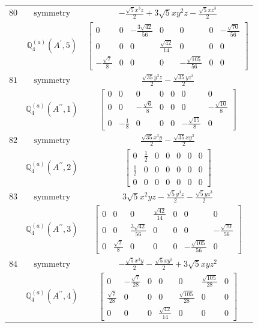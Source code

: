 \documentclass[fleqn,8pt,landscape]{jsarticle}
\begin{document}
\begin{longtable}{ccc}
$ 80 $ & $ \text{symmetry} $ & $ - \frac{\sqrt{5} x^{3} z}{2} + 3 \sqrt{5} x y^{2} z - \frac{\sqrt{5} x z^{3}}{2} $ \\
$  $ & $ \mathbb{Q}_{4}^{(a)}(A^{\prime},5) $ & $ \begin{bmatrix} 0 & 0 & - \frac{3 \sqrt{42}}{56} & 0 & 0 & 0 & - \frac{\sqrt{70}}{56} \\ 0 & 0 & 0 & \frac{\sqrt{42}}{14} & 0 & 0 & 0 \\ - \frac{\sqrt{7}}{8} & 0 & 0 & 0 & - \frac{\sqrt{105}}{56} & 0 & 0 \end{bmatrix} $ \\ \hline
$ 81 $ & $ \text{symmetry} $ & $ \frac{\sqrt{35} y^{3} z}{2} - \frac{\sqrt{35} y z^{3}}{2} $ \\
$  $ & $ \mathbb{Q}_{4}^{(a)}(A^{\prime\prime},1) $ & $ \begin{bmatrix} 0 & 0 & 0 & 0 & 0 & 0 & 0 \\ 0 & 0 & - \frac{\sqrt{6}}{8} & 0 & 0 & 0 & - \frac{\sqrt{10}}{8} \\ 0 & - \frac{1}{8} & 0 & 0 & 0 & - \frac{\sqrt{15}}{8} & 0 \end{bmatrix} $ \\ \hline
$ 82 $ & $ \text{symmetry} $ & $ \frac{\sqrt{35} x^{3} y}{2} - \frac{\sqrt{35} x y^{3}}{2} $ \\
$  $ & $ \mathbb{Q}_{4}^{(a)}(A^{\prime\prime},2) $ & $ \begin{bmatrix} 0 & \frac{1}{2} & 0 & 0 & 0 & 0 & 0 \\ \frac{1}{2} & 0 & 0 & 0 & 0 & 0 & 0 \\ 0 & 0 & 0 & 0 & 0 & 0 & 0 \end{bmatrix} $ \\ \hline
$ 83 $ & $ \text{symmetry} $ & $ 3 \sqrt{5} x^{2} y z - \frac{\sqrt{5} y^{3} z}{2} - \frac{\sqrt{5} y z^{3}}{2} $ \\
$  $ & $ \mathbb{Q}_{4}^{(a)}(A^{\prime\prime},3) $ & $ \begin{bmatrix} 0 & 0 & 0 & \frac{\sqrt{42}}{14} & 0 & 0 & 0 \\ 0 & 0 & \frac{3 \sqrt{42}}{56} & 0 & 0 & 0 & - \frac{\sqrt{70}}{56} \\ 0 & \frac{\sqrt{7}}{8} & 0 & 0 & 0 & - \frac{\sqrt{105}}{56} & 0 \end{bmatrix} $ \\ \hline
$ 84 $ & $ \text{symmetry} $ & $ - \frac{\sqrt{5} x^{3} y}{2} - \frac{\sqrt{5} x y^{3}}{2} + 3 \sqrt{5} x y z^{2} $ \\
$  $ & $ \mathbb{Q}_{4}^{(a)}(A^{\prime\prime},4) $ & $ \begin{bmatrix} 0 & - \frac{\sqrt{7}}{28} & 0 & 0 & 0 & \frac{\sqrt{105}}{28} & 0 \\ \frac{\sqrt{7}}{28} & 0 & 0 & 0 & \frac{\sqrt{105}}{28} & 0 & 0 \\ 0 & 0 & 0 & \frac{\sqrt{42}}{14} & 0 & 0 & 0 \end{bmatrix} $ \\ \hline

\end{longtable}
\end{document}
